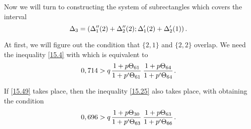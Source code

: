 Now we will turn to constructing the system of subrectangles which covers the interval
\begin{equation*}
	\Delta_3 = \left(
		\Delta_1''(2) + \Delta_2''(2);
		\Delta_1'(2) + \Delta_2'(1)
	\right).
\end{equation*}

At first, we will figure out the condition that $\{2, 1\}$ and $\{2, 2\}$ overlap.
We need the inequality \ref{15.4} with
which is equivalent to
\begin{equation}\label{15.49}
	0,714 > q \up{61}{61} \up{64}{64}.
\end{equation}

If \ref{15.49} takes place, then the inequality \ref{15.25} also takes place, with
obtaining the condition
\begin{equation}\label{15.50}
	0,696 > q \up{30}{63} \up{63}{66}.
\end{equation}

